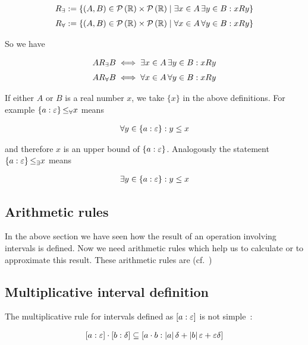 \begin{align}
  \existsrel{R} & := \{ (A,B) \in \pot{\R} \times \pot{\R} \mid \exists x\in A\,\exists y\in B : xRy \} \nl
  \forallrel{R} & := \{ (A,B) \in \pot{\R} \times \pot{\R} \mid \forall x\in A\,\forall y\in B : xRy \}
\end{align}

\noindent So we have

\begin{align}
  A \existsrel{R} B & \iff \exists x\in A\,\exists y\in B: xRy \nl
  A \forallrel{R} B & \iff \forall x\in A\,\forall y\in B: xRy
\end{align}

If either $A$ or $B$ is a real number $x$, we take $\{x\}$ in the above definitions. For example $\ean{a} \forallrel{\le} x$ means

\begin{align}
  \forall y \in \ean{a}: y \le x
\end{align}

\noindent and therefore $x$ is an upper bound of $\ean{a}$. Analogously the statement $\ean{a} \existsrel{\le} x$ means

\begin{align}
  \exists y \in \ean{a}: y \le x
\end{align}

\subsection{Arithmetic rules}

In the above section we have seen how the result of an operation involving intervals is defined. Now we need arithmetic rules which help us to calculate or to approximate this result. These arithmetic rules are (cf.~\cite[pp.~19-24.]{kulla})



\subsection{Multiplicative interval definition}

The multiplicative rule for intervals defined as $\an{a}$ is not simple~\cite[p.~22]{kulla}:

\begin{align}
  \an[\epsilon]{a} \cdot \an[\delta]{b} \subseteq \an[\abs{a}\delta+\abs{b}\epsilon+\epsilon\delta]{a\cdot b}
\end{align}

